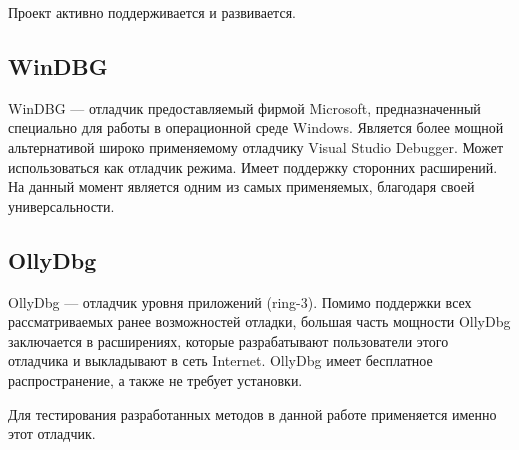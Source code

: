 Проект активно поддерживается и развивается.

\subsection{WinDBG}
WinDBG --- отладчик предоставляемый фирмой Microsoft, предназначенный специально
для работы в операционной среде Windows. Является более мощной альтернативой
широко применяемому отладчику Visual Studio Debugger. Может использоваться как
отладчик режима. Имеет поддержку сторонних расширений. На данный момент является
одним из самых применяемых, благодаря своей универсальности.

\subsection{OllyDbg}
OllyDbg --- отладчик уровня приложений (ring-3). Помимо поддержки всех
рассматриваемых ранее возможностей отладки, большая часть мощности OllyDbg
заключается в расширениях, которые разрабатывают пользователи этого отладчика и
выкладывают в сеть Internet. OllyDbg имеет бесплатное распространение, а также
не требует установки. 

Для тестирования разработанных методов в данной работе применяется именно этот
отладчик.
